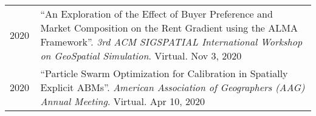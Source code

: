 \documentclass{acmcv}
\begin{document}
\begin{longtable}{p{0.1\linewidth} p{0.9\linewidth}}
        2020 & ``An Exploration of the Effect of Buyer Preference and Market Composition on the Rent Gradient using the ALMA Framework''. \textit{3rd ACM SIGSPATIAL International Workshop on GeoSpatial Simulation}. Virtual. Nov 3, 2020 \\

        2020 & ``Particle Swarm Optimization for Calibration in Spatially Explicit ABMs''. \textit{American Association of Geographers (AAG) Annual Meeting}. Virtual. Apr 10, 2020 \\




    \end{longtable}
    \vspace*{-0.2cm}
    
\end{document}
